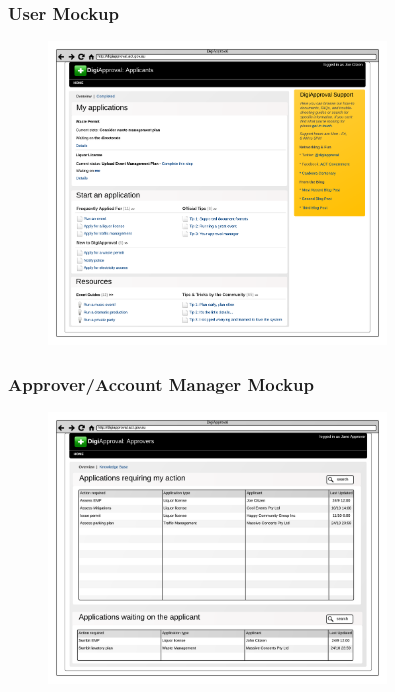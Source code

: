 \documentclass{beamer}
\begin{document}
\begin{frame}
  \frametitle{User Mockup}
  \begin{figure}[h!]
    \centering
    \includegraphics[width=0.8\textwidth]{./imgs/user-wireframe.png}
  \end{figure}
\end{frame}

\begin{frame}
  \frametitle{Approver/Account Manager Mockup}
  \begin{figure}[h!]
    \centering
    \includegraphics[width=0.8\textwidth]{./imgs/approver-wireframe.png}
  \end{figure}
\end{frame}
\end{document}
